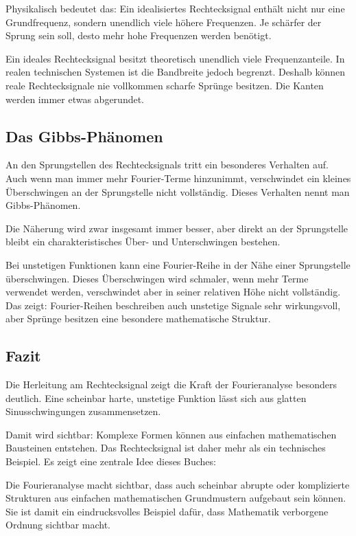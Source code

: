Physikalisch bedeutet das:
Ein idealisiertes Rechtecksignal enthält nicht nur eine Grundfrequenz,
sondern unendlich viele höhere Frequenzen.
Je schärfer der Sprung sein soll,
desto mehr hohe Frequenzen werden benötigt.

\begin{PhysicsBox}
	\small
	\label{box:anhangA-fourier-bandbreite}
	Ein ideales Rechtecksignal besitzt theoretisch unendlich viele Frequenzanteile.
	In realen technischen Systemen ist die Bandbreite jedoch begrenzt.
	Deshalb können reale Rechtecksignale nie vollkommen scharfe Sprünge besitzen.
	Die Kanten werden immer etwas abgerundet.
\end{PhysicsBox}

\subsection{Das Gibbs-Phänomen}

An den Sprungstellen des Rechtecksignals tritt ein besonderes Verhalten auf.
Auch wenn man immer mehr Fourier-Terme hinzunimmt,
verschwindet ein kleines Überschwingen an der Sprungstelle nicht vollständig.
Dieses Verhalten nennt man Gibbs-Phänomen.

Die Näherung wird zwar insgesamt immer besser,
aber direkt an der Sprungstelle bleibt ein charakteristisches Über- und Unterschwingen bestehen.

\begin{DidacticBox}
	\small
	\label{box:anhangA-fourier-gibbs}
	Bei unstetigen Funktionen kann eine Fourier-Reihe in der Nähe einer Sprungstelle
	überschwingen.
	Dieses Überschwingen wird schmaler, wenn mehr Terme verwendet werden,
	verschwindet aber in seiner relativen Höhe nicht vollständig.
	Das zeigt:
	Fourier-Reihen beschreiben auch unstetige Signale sehr wirkungsvoll,
	aber Sprünge besitzen eine besondere mathematische Struktur.
\end{DidacticBox}

\subsection{Fazit}

Die Herleitung am Rechtecksignal zeigt die Kraft der Fourieranalyse besonders deutlich.
Eine scheinbar harte, unstetige Funktion lässt sich aus glatten Sinusschwingungen zusammensetzen.

Damit wird sichtbar:
Komplexe Formen können aus einfachen mathematischen Bausteinen entstehen.
Das Rechtecksignal ist daher mehr als ein technisches Beispiel.
Es zeigt eine zentrale Idee dieses Buches:

\begin{NoteBox}
	\small
		\label{box:anhangA-fourier-ordnung-form}
	Die Fourieranalyse macht sichtbar,
	dass auch scheinbar abrupte oder komplizierte Strukturen
	aus einfachen mathematischen Grundmustern aufgebaut sein können.
	Sie ist damit ein eindrucksvolles Beispiel dafür,
	dass Mathematik verborgene Ordnung sichtbar macht.
\end{NoteBox}
